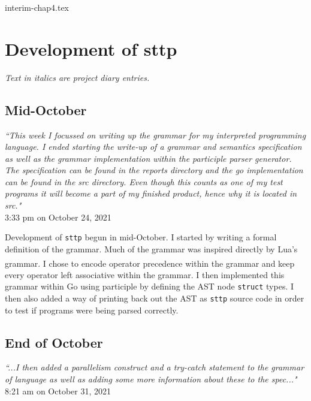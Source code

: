 \documentclass[]{interim}
\theoremstyle{definition}
\begin{document}
{interim-chap4.tex}

\chapter{Development of sttp}

\vspace{-2em}

\textit{Text in italics are project diary entries.}

\section{Mid-October}

\begin{center}
    \textit{``This week I focussed on writing up the grammar for my interpreted programming language. I ended starting the write-up of a grammar and semantics specification as well as the grammar implementation within the participle parser generator. The specification can be found in the reports directory and the go implementation can be found in the src directory. Even though this counts as one of my test programs it will become a part of my finished product, hence why it is located in src."}\\[0.5em]
    \tiny{3:33 pm on October 24, 2021}
\end{center}

Development of \verb|sttp| begun in mid-October. I started by writing a formal definition of the grammar. Much of the grammar was inspired directly by Lua's grammar\textsuperscript{\cite{ierusalimschy_henrique-de-figueiredo_celes_2020}}. I chose to encode operator precedence within the grammar and keep every operator left associative within the grammar. I then implemented this grammar within Go using participle by defining the AST node \verb|struct| types. I then also added a way of printing back out the AST as \verb|sttp| source code in order to test if programs were being parsed correctly.

\section{End of October}

\begin{center}
    \textit{``...I then added a parallelism construct and a try-catch statement to the grammar of language as well as adding some more information about these to the spec..."}\\[0.5em]
    \tiny{8:21 am on October 31, 2021}
\end{center}
\end{document}
